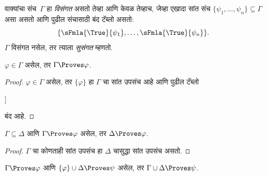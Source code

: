 \begin{defn}[सुसंगतता]
वाक्यांचा संच~$\Gamma$ हा \emph{विसंगत} असतो तेव्हा आणि केवळ तेव्हाच,
जेव्हा एखादा सांत संच $\{\psi_1, \dots, \psi_n\} \subseteq \Gamma$ असा असतो
आणि पुढील संचासाठी बंद टॅब्लो असतो:
\[\{
  \sFmla{\True}{\psi_1}, \dots,
  \sFmla{\True}{\psi_n}
  \}.
\]
$\Gamma$ विसंगत नसेल, तर त्याला \emph{सुसंगत} म्हणतो.
\end{defn}

\begin{prop}[परावर्तिता]
\label{fol:tab:ptn:prop:reflexivity}
$\varphi \in \Gamma$ असेल, तर $\Gamma \Proves \varphi$.
\end{prop}

\begin{proof}
$\varphi \in \Gamma$ असेल, तर $\{\varphi\}$ हा $\Gamma$ चा सांत उपसंच आहे आणि पुढील टॅब्लो
\begin{oltableau}
  [\sFmla{\False}{\varphi}, just = \TAss
    [\sFmla{\True}{\varphi}, just = \TAss,close]
  ]
\end{oltableau}
बंद आहे.
\end{proof}


\begin{prop}[एकस्वनिकता]
\label{fol:tab:ptn:prop:monotonicity}
$\Gamma \subseteq \Delta$ आणि $\Gamma \Proves \varphi$ असेल, तर $\Delta
\Proves \varphi$.
\end{prop}

\begin{proof}
$\Gamma$ चा कोणताही सांत उपसंच हा $\Delta$ चासुद्धा सांत उपसंच असतो.
\end{proof}

\begin{prop}[संक्रमकता]
\label{fol:tab:ptn:prop:transitivity}
$\Gamma \Proves \varphi$ आणि $\{\varphi\} \cup
\Delta \Proves \psi$ असेल, तर $\Gamma \cup \Delta \Proves \psi$.
\end{prop}

